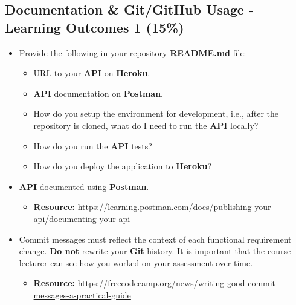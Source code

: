 \documentclass{article}
\begin{document}
\subsection*{Documentation \& Git/GitHub Usage - Learning Outcomes 1 (15\%)}
\begin{itemize}
	\item Provide the following in your repository \textbf{README.md} file:
	      \begin{itemize}
		      \item URL to your \textbf{API} on \textbf{Heroku}.
		      \item \textbf{API} documentation on \textbf{Postman}.
		      \item How do you setup the environment for development, i.e., after the repository is cloned, what do I need to run the \textbf{API} locally?
					\item How do you run the \textbf{API} tests?
					\item How do you deploy the application to \textbf{Heroku}?
	      \end{itemize}
			\end{itemize}
			\begin{itemize}
	\item \textbf{API} documented using \textbf{Postman}.
	\begin{itemize}
		\item \textbf{Resource:} \footnotesize\href{https://learning.postman.com/docs/publishing-your-api/documenting-your-api}{https://learning.postman.com/docs/publishing-your-api/documenting-your-api}
	\end{itemize}
	\item Commit messages must reflect the context of each functional requirement change. \textbf{Do not} rewrite your \textbf{Git} history. It is important that the course lecturer can see how you worked on your assessment over time.
	      \begin{itemize}
		      \item \textbf{Resource:} \footnotesize\href{https://freecodecamp.org/news/writing-good-commit-messages-a-practical-guide}{https://freecodecamp.org/news/writing-good-commit-messages-a-practical-guide}
	      \end{itemize}
\end{itemize}
\end{document}
